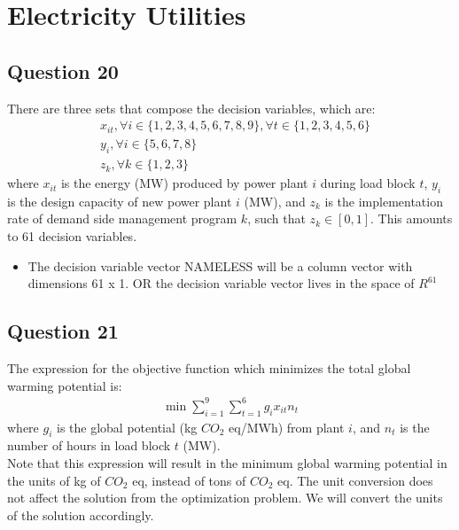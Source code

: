 \documentclass[11pt,a4paper]{article}
\begin{document}
\section*{Electricity Utilities}
\subsection*{Question 20}
There are three sets that compose the decision variables, which are:
\begin{align*}
	& x_{it},  \forall  i \in \{1,2,3,4,5,6,7,8,9\}, \forall  t \in \{1,2,3,4,5,6\}\\
	& y_i,  \forall  i \in \{5,6,7,8\}\\
	& z_k,  \forall  k \in \{1,2,3\}
\end{align*}
where $x_{it}$ is the energy (MW) produced by power plant $i$ during load block $t$,
$y_i$ is the design capacity of new power plant $i$ (MW), and $z_k$ is the implementation rate of demand side management program $k$, such that $z_k \in  [0,1]$. This amounts to 61 decision variables. 
\begin{itemize}
	\item The decision variable vector NAMELESS will be a column vector with dimensions 61 x 1. OR the decision variable vector lives in the space of $R^{61}$
\end{itemize}

\subsection*{Question 21}
The expression for the objective function which minimizes the total global warming potential is:
\begin{align*}
	\min \sum_{i=1}^{9}\sum_{t=1}^{6} g_{i}x_{it}n_{t}
\end{align*}
where $g_{i}$ is the global potential (kg $CO_2$ eq/MWh) from plant $i$, and $n_{t}$ is the number of hours in load block $t$ (MW).\\
Note that this expression will result in the minimum global warming potential in the units of kg of $CO_2$ eq, instead of tons of $CO_2$ eq. The unit conversion does not affect the solution from the optimization problem. We will convert the units of the solution accordingly.
\end{document}
